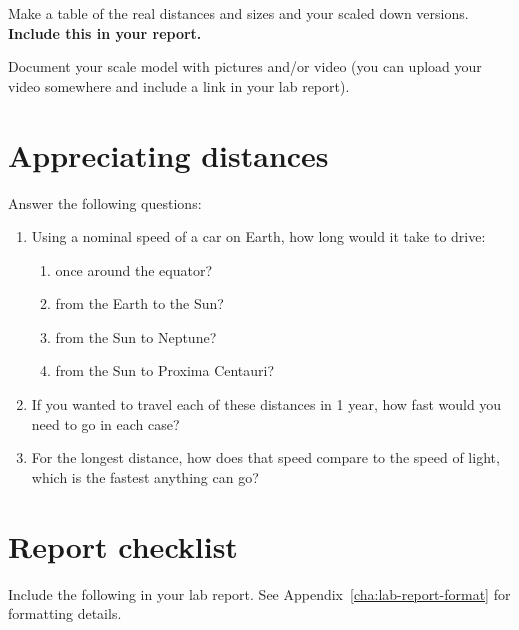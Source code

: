\begin{steps}
	\item Make a table of the real distances and sizes and your scaled down versions. \textbf{Include this in your report.}
	
	\item Document your scale model with pictures and/or video (you can upload your video somewhere and include a link in your lab report).
\end{steps}

\section{Appreciating distances}\label{se:sec:calc}

Answer the following questions:
\begin{enumerate}
	\item Using a nominal speed of a car on Earth, how long would it take to drive:
	\begin{enumerate}
		\item once around the equator?
		\item from the Earth to the Sun?
		\item from the Sun to Neptune?
		\item from the Sun to Proxima Centauri?
	\end{enumerate}
	\item If you wanted to travel each of these distances in 1 year, how fast would you need to go in each case?
	\item For the longest distance, how does that speed compare to the speed of light, which is the fastest anything can go?
\end{enumerate}

\section{Report checklist}

Include the following in your lab report. See Appendix~\ref{cha:lab-report-format} for formatting details.


